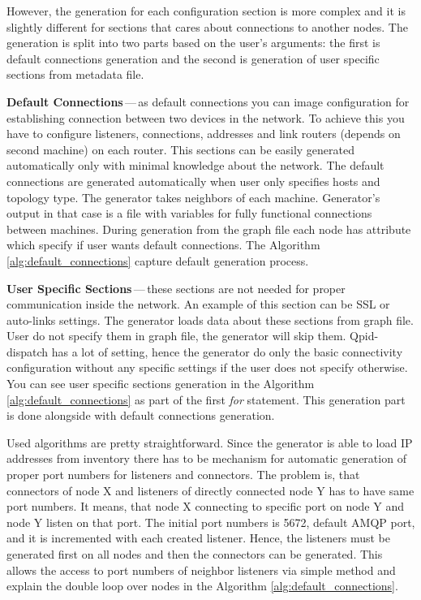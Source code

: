 However, the generation for each configuration section is more complex and it is slightly different for sections that cares about connections to another nodes. The generation is split into two parts based on the user's arguments: the first is default connections generation and the second is generation of user specific sections from metadata file.

\begin{description}
	\item \textbf{Default Connections}\,---\,as default connections you can image configuration for establishing connection between two devices in the network. To achieve this you have to configure listeners, connections, addresses and link routers (depends on second machine) on each router. This sections can be easily generated automatically only with minimal knowledge about the network. The default connections are generated automatically when user only specifies hosts and topology type. The generator takes neighbors of each machine. Generator's output in that case is a file with variables for fully functional connections between machines. During generation from the graph file each node has attribute which specify if user wants default connections. The Algorithm \ref{alg:default_connections} capture default generation process.

	\item \textbf{User Specific Sections}\,---\,these sections are not needed for proper communication inside the network. An example of this section can be SSL or auto-links settings. The generator loads data about these sections from graph file. User do not specify them in graph file, the generator will skip them. Qpid-dispatch has a lot of setting, hence the generator do only the basic connectivity configuration without any specific settings if the user does not specify otherwise. You can see user specific sections generation in the Algorithm \ref{alg:default_connections} as part of the first \emph{for} statement. This generation part is done alongside with default connections generation.

\end{description}

Used algorithms are pretty straightforward. Since the generator is able to load IP addresses from inventory there has to be mechanism for automatic generation of proper port numbers for listeners and connectors. The problem is, that connectors of node X and listeners of directly connected node Y has to have same port numbers. It means, that node X connecting to specific port on node Y and node Y listen on that port. The initial port numbers is 5672, default AMQP port, and it is incremented with each created listener. Hence, the listeners must be generated first on all nodes and then the connectors can be generated. This allows the access to port numbers of neighbor listeners via simple method and explain the double loop over nodes in the Algorithm \ref{alg:default_connections}.

